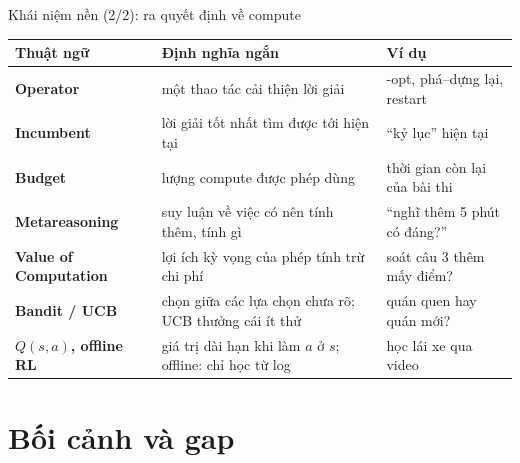 \documentclass[t, aspectratio=169]{beamer}
\begin{document}
	\begin{frame}{Khái niệm nền (2/2): ra quyết định về compute}
		\centering\footnotesize
		\renewcommand{\arraystretch}{1.12}
		\begin{tabular}{@{}>{\raggedright\arraybackslash\leavevmode\color{hustprimary}\bfseries}p{}>{\raggedright\arraybackslash}p{}>{\raggedright\arraybackslash}p{}@{}}
			\toprule
			\color{black}Thuật ngữ & \textbf{Định nghĩa ngắn} & \textbf{Ví dụ} \\
			\midrule
			Operator & một thao tác cải thiện lời giải & 2-opt, phá--dựng lại, restart \\
			Incumbent & lời giải tốt nhất tìm được tới hiện tại & “kỷ lục” hiện tại \\
			Budget & lượng compute được phép dùng & thời gian còn lại của bài thi \\
			Metareasoning & suy luận về việc có nên tính thêm, tính gì & “nghĩ thêm 5 phút có đáng?” \\
			Value of Computation & lợi ích kỳ vọng của phép tính trừ chi phí & soát câu 3 thêm mấy điểm? \\
			Bandit / UCB & chọn giữa các lựa chọn chưa rõ; UCB thưởng cái ít thử & quán quen hay quán mới? \\
			$Q(s,a)$, offline RL & giá trị dài hạn khi làm $a$ ở $s$; offline: chỉ học từ log & học lái xe qua video \\
			\bottomrule
		\end{tabular}
	\end{frame}

	\section{Bối cảnh và gap}
\end{document}
